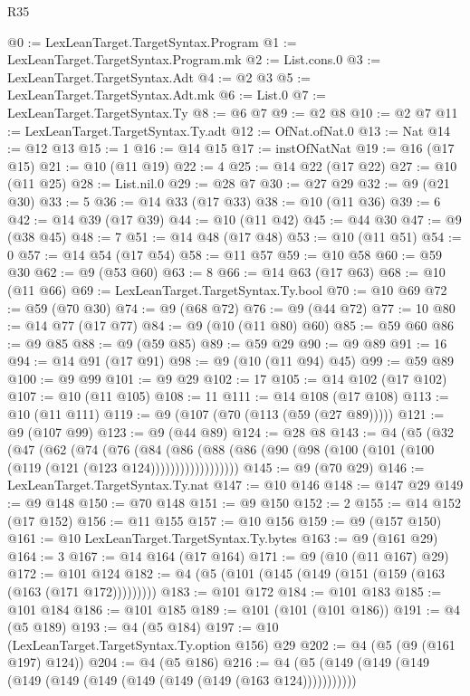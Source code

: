 \begin{lexlean}{R35}
\begin{coremodule}
@0 := LexLeanTarget.TargetSyntax.Program
@1 := LexLeanTarget.TargetSyntax.Program.mk
@2 := List.cons.{0}
@3 := LexLeanTarget.TargetSyntax.Adt
@4 := @2 @3
@5 := LexLeanTarget.TargetSyntax.Adt.mk
@6 := List.{0}
@7 := LexLeanTarget.TargetSyntax.Ty
@8 := @6 @7
@9 := @2 @8
@10 := @2 @7
@11 := LexLeanTarget.TargetSyntax.Ty.adt
@12 := OfNat.ofNat.{0}
@13 := Nat
@14 := @12 @13
@15 := 1
@16 := @14 @15
@17 := instOfNatNat
@19 := @16 (@17 @15)
@21 := @10 (@11 @19)
@22 := 4
@25 := @14 @22 (@17 @22)
@27 := @10 (@11 @25)
@28 := List.nil.{0}
@29 := @28 @7
@30 := @27 @29
@32 := @9 (@21 @30)
@33 := 5
@36 := @14 @33 (@17 @33)
@38 := @10 (@11 @36)
@39 := 6
@42 := @14 @39 (@17 @39)
@44 := @10 (@11 @42)
@45 := @44 @30
@47 := @9 (@38 @45)
@48 := 7
@51 := @14 @48 (@17 @48)
@53 := @10 (@11 @51)
@54 := 0
@57 := @14 @54 (@17 @54)
@58 := @11 @57
@59 := @10 @58
@60 := @59 @30
@62 := @9 (@53 @60)
@63 := 8
@66 := @14 @63 (@17 @63)
@68 := @10 (@11 @66)
@69 := LexLeanTarget.TargetSyntax.Ty.bool
@70 := @10 @69
@72 := @59 (@70 @30)
@74 := @9 (@68 @72)
@76 := @9 (@44 @72)
@77 := 10
@80 := @14 @77 (@17 @77)
@84 := @9 (@10 (@11 @80) @60)
@85 := @59 @60
@86 := @9 @85
@88 := @9 (@59 @85)
@89 := @59 @29
@90 := @9 @89
@91 := 16
@94 := @14 @91 (@17 @91)
@98 := @9 (@10 (@11 @94) @45)
@99 := @59 @89
@100 := @9 @99
@101 := @9 @29
@102 := 17
@105 := @14 @102 (@17 @102)
@107 := @10 (@11 @105)
@108 := 11
@111 := @14 @108 (@17 @108)
@113 := @10 (@11 @111)
@119 := @9 (@107 (@70 (@113 (@59 (@27 @89)))))
@121 := @9 (@107 @99)
@123 := @9 (@44 @89)
@124 := @28 @8
@143 := @4
    (@5
      (@32
        (@47
          (@62
            (@74
              (@76
                (@84
                  (@86
                    (@88 (@86 (@90 (@98 (@100 (@101 (@100 (@119 (@121 (@123 @124))))))))))))))))))
@145 := @9 (@70 @29)
@146 := LexLeanTarget.TargetSyntax.Ty.nat
@147 := @10 @146
@148 := @147 @29
@149 := @9 @148
@150 := @70 @148
@151 := @9 @150
@152 := 2
@155 := @14 @152 (@17 @152)
@156 := @11 @155
@157 := @10 @156
@159 := @9 (@157 @150)
@161 := @10 LexLeanTarget.TargetSyntax.Ty.bytes
@163 := @9 (@161 @29)
@164 := 3
@167 := @14 @164 (@17 @164)
@171 := @9 (@10 (@11 @167) @29)
@172 := @101 @124
@182 := @4 (@5 (@101 (@145 (@149 (@151 (@159 (@163 (@163 (@171 @172)))))))))
@183 := @101 @172
@184 := @101 @183
@185 := @101 @184
@186 := @101 @185
@189 := @101 (@101 (@101 @186))
@191 := @4 (@5 @189)
@193 := @4 (@5 @184)
@197 := @10 (LexLeanTarget.TargetSyntax.Ty.option @156) @29
@202 := @4 (@5 (@9 (@161 @197) @124))
@204 := @4 (@5 @186)
@216 := @4 (@5 (@149 (@149 (@149 (@149 (@149 (@149 (@149 (@149 (@149 (@163 @124)))))))))))

\end{coremodule}
\end{lexlean}
